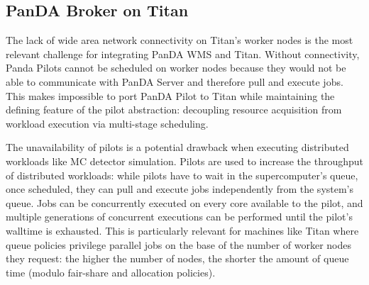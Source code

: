 

\subsection{PanDA Broker on Titan}
\label{ssec:panda_titan}

The lack of wide area network connectivity on Titan's worker nodes is the most
relevant challenge for integrating PanDA WMS and Titan. Without connectivity,
Panda Pilots cannot be scheduled on worker nodes because they would not be able
to communicate with PanDA Server and therefore pull and execute jobs. This makes
impossible to port PanDA Pilot to Titan while maintaining the defining feature
of the pilot abstraction: decoupling resource acquisition from workload
execution via multi-stage scheduling.

The unavailability of pilots is a potential drawback when executing distributed
workloads like MC detector simulation. Pilots are used to increase the
throughput of distributed workloads: while pilots have to wait in the
supercomputer's queue, once scheduled, they can pull and execute jobs
independently from the system's queue. Jobs can be concurrently executed on
every core available to the pilot, and multiple generations of concurrent
executions can be performed until the pilot's walltime is exhausted. This is
particularly relevant for machines like Titan where queue policies privilege
parallel jobs on the base of the number of worker nodes they request: the higher
the number of nodes, the shorter the amount of queue time (modulo fair-share and
allocation policies).


